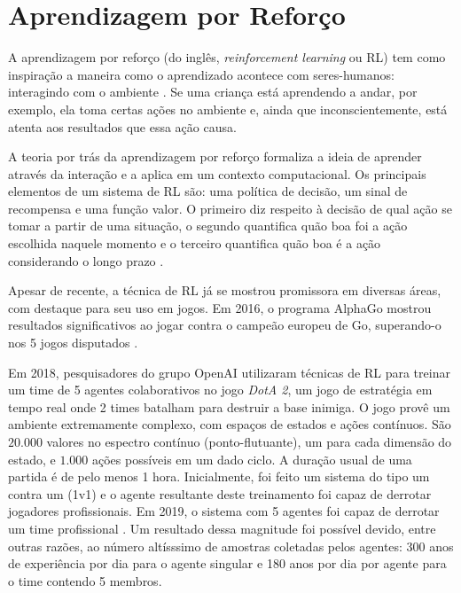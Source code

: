 \section{Aprendizagem por Reforço}
\par A aprendizagem por reforço (do inglês, \textit{reinforcement learning} ou RL) tem como inspiração a maneira como o aprendizado acontece com seres-humanos: interagindo com o ambiente \cite{sutton2018reinforcement}. Se uma criança está aprendendo a andar, por exemplo, ela toma certas ações no ambiente e, ainda que inconscientemente, está atenta aos resultados que essa ação causa. 
\par A teoria por trás da aprendizagem por reforço formaliza a ideia de aprender através da interação e a aplica em um contexto computacional. Os principais elementos de um sistema de RL são: uma política de decisão, um sinal de recompensa e uma função valor.  O primeiro diz respeito à decisão de qual ação se tomar a partir de uma situação, o segundo quantifica quão boa foi a ação escolhida naquele momento e o terceiro quantifica quão boa é a ação considerando o longo prazo \cite{sutton2018reinforcement}.
\par Apesar de recente, a técnica de RL já se mostrou promissora em diversas áreas, com destaque para seu uso em jogos. Em 2016, o programa AlphaGo mostrou resultados significativos ao jogar contra o campeão europeu de Go, superando-o nos 5 jogos disputados \cite{SilverHuangEtAl16nature}.

Em 2018, pesquisadores do grupo OpenAI utilizaram técnicas de RL para treinar um time de 5 agentes colaborativos no jogo \textit{DotA 2}, um jogo de estratégia em tempo real onde 2 times batalham para destruir a base inimiga. O jogo provê um ambiente extremamente complexo, com espaços de estados e ações contínuos. São $20.000$ valores no espectro contínuo (ponto-flutuante), um para cada dimensão do estado, e $1.000$ ações possíveis em um dado ciclo.
A duração usual de uma partida é de pelo menos 1 hora. Inicialmente, foi feito um sistema do tipo um contra um (1v1) e o agente resultante deste treinamento foi capaz de derrotar jogadores profissionais. Em 2019, o sistema com 5 agentes foi capaz de derrotar um time profissional \cite{OpenAI_dota}. Um resultado dessa magnitude foi possível devido, entre outras razões, ao número altísssimo de amostras coletadas pelos agentes: 300 anos de experiência por dia para o agente singular e 180 anos por dia por agente para o time contendo 5 membros.

